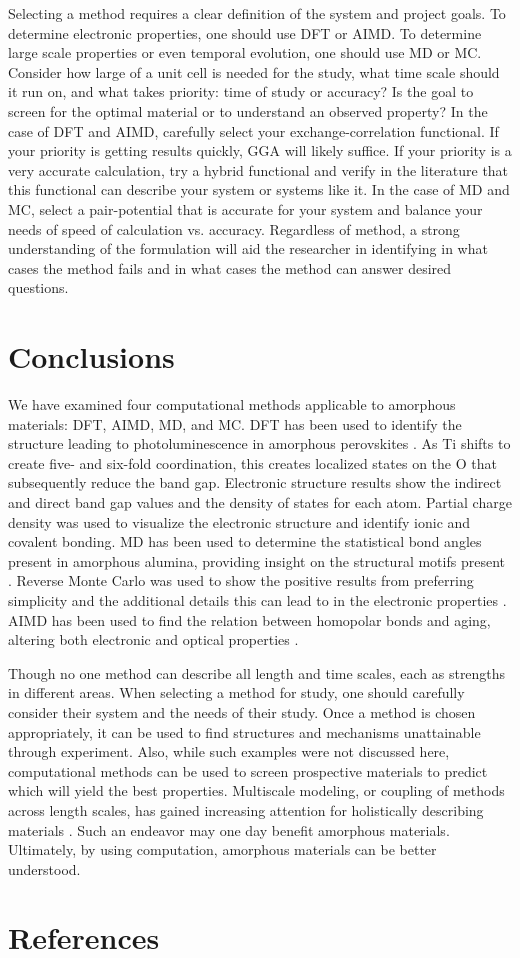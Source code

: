 \documentclass[3p,review,12pt]{elsarticle}
\begin{document}
Selecting a method requires a clear definition of the system and project goals. To determine electronic properties, one should use DFT or AIMD. To determine large scale properties or even temporal evolution, one should use MD or MC. Consider how large of a unit cell is needed for the study, what time scale should it run on, and what takes priority: time of study or accuracy? Is the goal to screen for the optimal material or to understand an observed property? In the case of DFT and AIMD, carefully select your exchange-correlation functional. If your priority is getting results quickly, GGA will likely suffice. If your priority is a very accurate calculation, try a hybrid functional and verify in the literature that this functional can describe your system or systems like it. In the case of MD and MC, select a pair-potential that is accurate for your system and balance your needs of speed of calculation vs. accuracy. Regardless of method, a strong understanding of the formulation will aid the researcher in identifying in what cases the method fails and in what cases the method can answer desired questions.




\section{Conclusions}
We have examined four computational methods applicable to amorphous materials: DFT, AIMD, MD, and MC. DFT has been used to identify the structure leading to photoluminescence in amorphous perovskites \cite{Longo2004}. As Ti shifts to create five- and six-fold coordination, this creates localized states on the O that subsequently reduce the band gap. Electronic structure results show the indirect and direct band gap values and the density of states for each atom. Partial charge density was used to visualize the electronic structure and identify ionic and covalent bonding. 
MD has been used to determine the statistical bond angles present in amorphous alumina, providing insight on the structural motifs present \cite{Gutierrez2002}. Reverse Monte Carlo was used to show the positive results from preferring simplicity and the additional details this can lead to in the electronic properties \cite{Cliffe2017}. AIMD has been used to find the relation between homopolar bonds and aging, altering both electronic and optical properties \cite{Raty2015}.
\par Though no one method can describe all length and time scales, each as strengths in different areas. When selecting a method for study, one should carefully consider their system and the needs of their study. Once a method is chosen appropriately, it can be used to find structures and mechanisms unattainable through experiment. Also, while such examples were not discussed here, computational methods can  be used to screen prospective materials to predict which will yield the best properties. Multiscale modeling, or coupling of methods across length scales, has gained increasing attention for holistically describing materials \cite{DePablo2007}. Such an endeavor may one day benefit amorphous materials. Ultimately, by using computation, amorphous materials can be better understood.




\section*{References}



\end{document}

